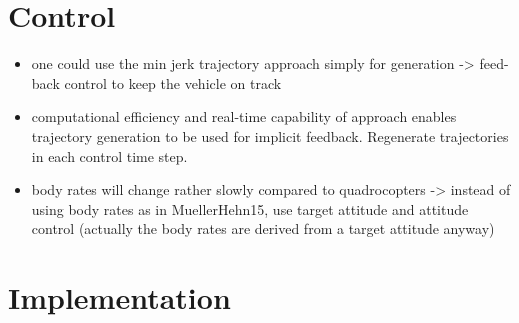 \section{Control}
\label{sec:control}
\begin{itemize}
	\color{red}
	\item one could use the min jerk trajectory approach simply for generation -> feed-back control to keep the vehicle on track
	\item computational efficiency and real-time capability of approach enables trajectory generation to be used for implicit feedback. Regenerate trajectories in each control time step.
	\item body rates will change rather slowly compared to quadrocopters -> instead of using body rates as in MuellerHehn15, use target attitude and attitude control (actually the body rates are derived from a target attitude anyway)
\end{itemize}

\section{Implementation}
\label{sec:implementation}
